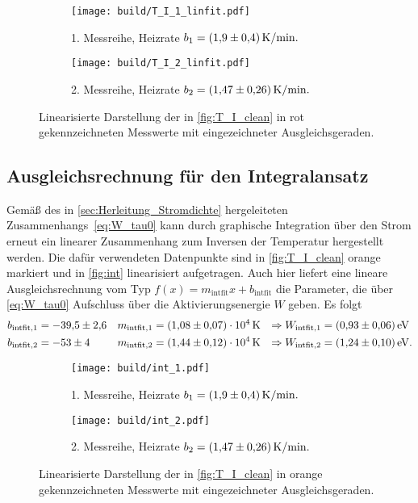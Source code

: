 \begin{figure}
    \centering
    \begin{subfigure}{\textwidth}
        \centering
        \texttt{[image: build/T\_I\_1\_linfit.pdf]}
        \caption{1. Messreihe, Heizrate $b_1 = \qty{1.9+-0.4}{\kelvin\per\minute}.$}
        \label{fig:T_I_1_Anstieg}
    \end{subfigure}
    \begin{subfigure}{\textwidth}
        \centering
        \texttt{[image: build/T\_I\_2\_linfit.pdf]}
        \caption{2. Messreihe, Heizrate $b_2 = \qty{1.47+-0.26}{\kelvin\per\minute}.$}
        \label{fig:T_I_2_Anstieg}
    \end{subfigure}
    \caption{Linearisierte Darstellung der in \autoref{fig:T_I_clean} in rot gekennzeichneten Messwerte mit eingezeichneter Ausgleichsgeraden.}
    \label{fig:T_I_Anstieg}
\end{figure}


\newpage

\subsection{Ausgleichsrechnung für den Integralansatz}
\label{sec:Ausgleichsrechnung_Integralansatz}
Gemäß des in \autoref{sec:Herleitung_Stromdichte} hergeleiteten Zusammenhangs~\eqref{eq:W_tau0} kann durch graphische Integration über den Strom erneut ein linearer 
Zusammenhang zum Inversen der Temperatur hergestellt werden. Die dafür verwendeten Datenpunkte sind in \autoref{fig:T_I_clean} orange markiert und in \autoref{fig:int}
linearisiert aufgetragen. Auch hier liefert eine lineare Ausgleichsrechnung vom Typ $f(x) = m_\text{intfit}x + b_{\text{intfit}}$ die Parameter, die über \autoref{eq:W_tau0} Aufschluss
über die Aktivierungsenergie $W$ geben. Es folgt
\begin{align*}
    b_{\text{intfit}, 1} &= \num{-39.5+-2.6} & m_{\text{intfit}, 1} &= \qty{1.08(0.07)e+04}{\kelvin} &\Rightarrow W_{\text{intfit}, 1} &= \qty{0.93+-0.06}{\electronvolt} \\
    b_{\text{intfit}, 2} &= \num{-53+-4}     & m_{\text{intfit}, 2} &= \qty{1.44(0.12)e+04}{\kelvin} &\Rightarrow W_{\text{intfit}, 2} &= \qty{1.24+-0.10}{\electronvolt}. \\
\end{align*}

\begin{figure}
    \centering
    \begin{subfigure}{\textwidth}
        \centering
        \texttt{[image: build/int\_1.pdf]}
        \caption{1. Messreihe, Heizrate $b_1 = \qty{1.9+-0.4}{\kelvin\per\minute}.$}
        \label{fig:int_1}
    \end{subfigure}
    \begin{subfigure}{\textwidth}
        \centering
        \texttt{[image: build/int\_2.pdf]}
        \caption{2. Messreihe, Heizrate $b_2 = \qty{1.47+-0.26}{\kelvin\per\minute}.$}
        \label{fig:int_2}
    \end{subfigure}
    \caption{Linearisierte Darstellung der in \autoref{fig:T_I_clean} in orange gekennzeichneten Messwerte mit eingezeichneter Ausgleichsgeraden.}
    \label{fig:int}
\end{figure}

